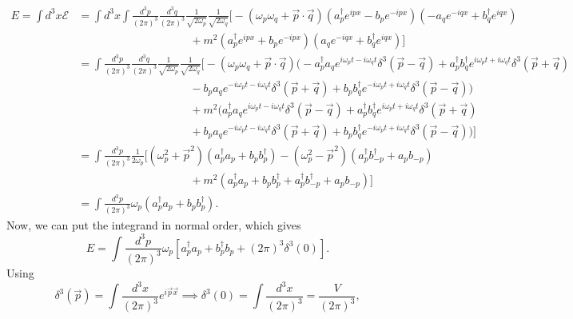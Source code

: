 \documentclass[11pt]{article}
\theoremstyle{definition}
\begin{document}
\begin{equation}
    \begin{aligned}
        E = \int d^3x\mathcal{E} &= \int d^3x \int\frac{d^3p}{(2\pi)^3}\frac{d^3q}{(2\pi)^3}\frac{1}{\sqrt{2\omega_p}}\frac{1}{\sqrt{2\omega_q}}\bigg[ -(\omega_p\omega_q+\vec{p}\cdot\vec{q})(a_p^\dagger e^{ipx} -b_p e^{-ipx} )(-a_qe^{-iqx} + b_q^\dagger e^{iqx}) \\
        &\qquad \qquad \qquad \qquad \qquad +m^2(a_p^\dagger e^{ipx} + b_p e^{-ipx} )(a_qe^{-iqx} + b_q^\dagger e^{iqx})\bigg] \\
        &= \int\frac{d^3p}{(2\pi)^3}\frac{d^3q}{(2\pi)^3}\frac{1}{\sqrt{2\omega_p}}\frac{1}{\sqrt{2\omega_q}}\bigg[ -(\omega_p\omega_q+\vec{p}\cdot\vec{q})\bigg(-a_p^\dagger a_q e^{i\omega_pt-i\omega_qt}\delta^3(\vec{p}-\vec{q}) + a_p^\dagger b_q^\dagger e^{i\omega_pt+i\omega_qt}\delta^3(\vec{p}+\vec{q}) \\
        & \qquad \qquad \qquad \qquad \qquad -b_p a_q e^{-i\omega_pt-i\omega_qt}\delta^3(\vec{p}+\vec{q}) + b_p b_q^\dagger e^{-i\omega_pt+i\omega_qt}\delta^3(\vec{p}-\vec{q})\bigg) \\
        &\qquad \qquad \qquad \qquad \qquad +m^2\bigg(a_p^\dagger a_q e^{i\omega_pt-i\omega_qt}\delta^3(\vec{p}-\vec{q}) + a_p^\dagger b_q^\dagger e^{i\omega_pt+i\omega_qt}\delta^3(\vec{p}+\vec{q}) \\
        & \qquad \qquad \qquad \qquad \qquad + b_p a_q e^{-i\omega_pt-i\omega_qt}\delta^3(\vec{p}+\vec{q}) + b_p b_q^\dagger e^{-i\omega_pt+i\omega_qt}\delta^3(\vec{p}-\vec{q})\bigg)\bigg] \\
        &= \int \frac{d^3p}{(2\pi)^3}\frac{1}{2\omega_p} \bigg[ (\omega_p^2 + \vec{p}^2)(a_p^\dagger a_p + b_pb_p^\dagger) - (\omega_p^2 - \vec{p}^2)(a_p^\dagger b_{-p}^\dagger + a_pb_{-p}) \\
        &\qquad \qquad \qquad \qquad \qquad + m^2(a_p^\dagger a_p + b_pb_p^\dagger + a_p^\dagger b_{-p}^\dagger + a_pb_{-p}) \bigg] \\
        &= \int \frac{d^3p}{(2\pi)^3} \omega_p(a_p^\dagger a_p + b_p b_p^\dagger).
    \end{aligned}    
\end{equation}
Now, we can put the integrand in normal order, which gives
\begin{equation}
    E = \int \frac{d^3p}{(2\pi)^3} \omega_p[a_p^\dagger a_p + b_p^\dagger b_p + (2\pi)^3\delta^3(0)].
\end{equation}
Using
\begin{equation}
    \delta^3(\vec{p}) = \int\frac{d^3x}{(2\pi)^3}e^{i\vec{p}\vec{x}} \implies \delta^3(0) = \int\frac{d^3x}{(2\pi)^3} = \frac{V}{(2\pi)^3},
\end{equation}
\end{document}
